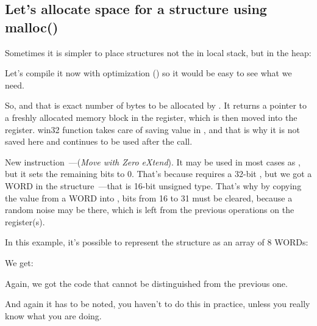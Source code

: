\subsection{Let's allocate space for a structure using malloc()}
\label{struct_malloc_example}


Sometimes it is simpler to place structures not the in local stack, but in the \gls{heap}:




Let's compile it now with optimization (\Ox) so it would be easy to see what we need.




So,  and that is exact number of bytes to be allocated by .
It returns a pointer to a freshly allocated memory block in the \EAX register,
which is then moved into the \ESI register.
 win32 function takes care of saving value in \ESI,
and that is why it is not saved here and continues to be used after the  call.


New instruction~---\MOVZX (\emph{Move with Zero eXtend}).
It may be used in most cases as \MOVSX, but it sets the remaining bits to 0.
That's because \printf requires a 32-bit \Tint, but we got a WORD in the structure~---that
is 16-bit unsigned type.
That's why by copying the value from a WORD into \Tint{}, bits from 16 to 31 must be cleared, 
because a random noise may be there, which is left from the previous operations on the register(s).


In this example, it's possible to represent the structure as an array of 8 WORDs:



We get:




Again, we got the code that cannot be distinguished from the previous one.

And again it has to be noted, you haven't to do this in practice, unless you really know what you are doing.

